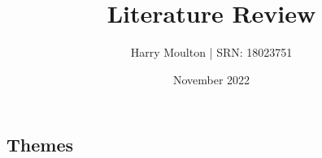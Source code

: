 \documentclass{article}
\title{Literature Review}
\author{Harry Moulton | SRN: 18023751}
\date{November 2022}
\begin{document}
\maketitle
\begin{multicols}{2}



\section{Themes}





\end{multicols}




\pagebreak
\printbibliography
%
\end{document}
